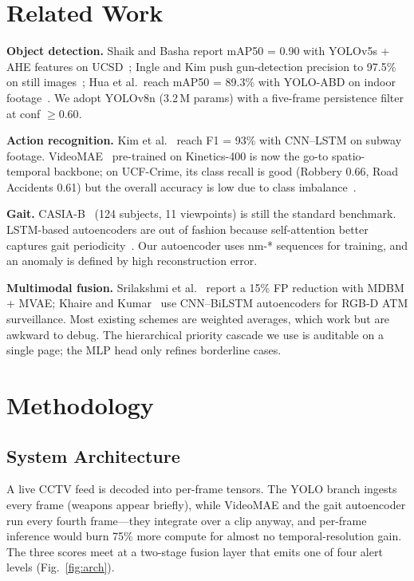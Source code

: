 \documentclass[runningheads]{llncs}
\begin{document}
\section{Related Work}\label{sec:related}

\textbf{Object detection.} Shaik and Basha report mAP50 = 0.90 with YOLOv5s + AHE features on UCSD~\cite{shaik2025}; Ingle and Kim push gun-detection precision to 97.5\% on still images~\cite{ingle2022}; Hua et al.\ reach mAP50 = 89.3\% with YOLO-ABD on indoor footage~\cite{hua2024}. We adopt YOLOv8n (3.2\,M params) with a five-frame persistence filter at conf $\geq 0.60$.

\textbf{Action recognition.} Kim et al.~\cite{kim2024} reach F1 = 93\% with CNN--LSTM on subway footage. VideoMAE~\cite{tong2022} pre-trained on Kinetics-400 is now the go-to spatio-temporal backbone; on UCF-Crime, its class recall is good (Robbery 0.66, Road Accidents 0.61) but the overall accuracy is low due to class imbalance~\cite{ucfcrime}.


\textbf{Gait.} CASIA-B~\cite{casiab} (124 subjects, 11 viewpoints) is still the standard benchmark. LSTM-based autoencoders are out of fashion because self-attention better captures gait periodicity~\cite {veesam2025}. Our autoencoder uses nm-* sequences for training, and an anomaly is defined by high reconstruction error.

\textbf{Multimodal fusion.} Srilakshmi et al.~\cite{srilakshmi2025} report a 15\% FP reduction with MDBM + MVAE; Khaire and Kumar~\cite{khaire2022} use CNN--BiLSTM autoencoders for RGB-D ATM surveillance. Most existing schemes are weighted averages, which work but are awkward to debug. The hierarchical priority cascade we use is auditable on a single page; the MLP head only refines borderline cases.

\section{Methodology}\label{sec:method}

\subsection{System Architecture}

A live CCTV feed is decoded into per-frame tensors. The YOLO branch ingests every frame (weapons appear briefly), while VideoMAE and the gait autoencoder run every fourth frame—they integrate over a clip anyway, and per-frame inference would burn 75\% more compute for almost no temporal-resolution gain. The three scores meet at a two-stage fusion layer that emits one of four alert levels (Fig.~\ref{fig:arch}).
\end{document}
